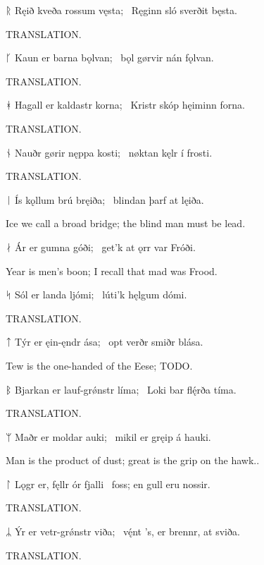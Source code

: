 \bvg\bva ᚱ Ręið kveða rossum vęsta; \hld\ Ręginn sló sverðit bęsta.\eva

\bvb TRANSLATION.\evb\evg


\bvg\bva ᚴ Kaun er barna bǫlvan; \hld\ bǫl gørvir nán fǫlvan.\eva

\bvb TRANSLATION.\evb\evg


\bvg\bva ᚼ Hagall er kaldastr korna; \hld\ Kristr skóp hęiminn forna.\eva

\bvb TRANSLATION.\evb\evg


\bvg\bva ᚾ Nauðr gørir nęppa kosti; \hld\ nøktan kęlr í frosti.\eva

\bvb TRANSLATION.\evb\evg


\bvg\bva ᛁ Ís kǫllum brú bręiða; \hld\ blindan þarf at lęiða.\eva

\bvb Ice we call a broad bridge; the blind man must be lead.\evb\evg


\bvg\bva ᛅ Ár er gumna góði; \hld\ get’k at ǫrr var Fróði.\eva

\bvb Year is men’s boon; I recall that mad was Frood.\evb\evg


\bvg\bva ᛋ Sól er landa ljómi; \hld\ lúti’k hęlgum dómi.\eva

\bvb TRANSLATION.\evb\evg


\bvg\bva ᛏ Týr er ęin-ęndr ása; \hld\ opt verðr smiðr blása.\eva

\bvb Tew is the one-handed of the Eese; TODO.\evb\evg


\bvg\bva ᛒ Bjarkan er lauf-grǿnstr líma; \hld\ Loki bar flę́rða tíma.\eva

\bvb TRANSLATION.\evb\evg


\bvg\bva ᛘ Maðr er moldar auki; \hld\ mikil er gręip á hauki.\eva

\bvb Man is the product of dust; great is the grip on the hawk..\evb\evg


\bvg\bva ᛚ Lǫgr er, fęllr ór fjalli \hld\ foss; en gull eru nossir.\eva

\bvb TRANSLATION.\evb\evg


\bvg\bva ᛦ Ýr er vetr-grǿnstr viða; \hld\ vę́nt ’s, er brennr, at sviða. \eva

\bvb TRANSLATION.\evb\evg

\sectionline
